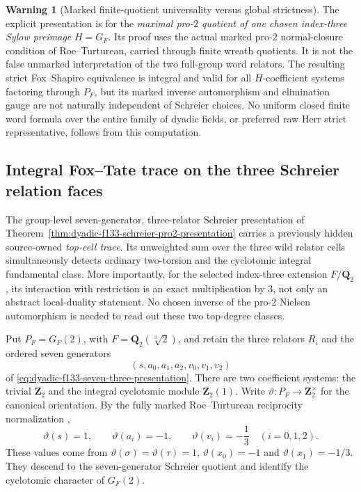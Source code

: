 \documentclass[11pt]{article}
\theoremstyle{definition}
\newtheorem{warning}[theorem]{Warning}
\begin{document}
\begin{warning}[Marked finite-quotient universality versus global strictness]
\label{warn:dyadic-f133-pro2-marked-scope}
The explicit
presentation is
for the
\emph{maximal
pro-$2$ quotient
of one chosen
index-three
Sylow preimage}
$H=G_F$.
Its proof uses
the actual
marked pro-$2$
normal-closure
condition of
Roe--Turturean,
carried through
finite wreath
quotients.
It is not
the false
unmarked
interpretation
of the two
full-group
word relators.
The resulting
strict
Fox--Shapiro
equivalence is
integral and
valid for
all $H$-coefficient
systems
factoring
through $P_F$,
but its marked
inverse automorphism
and elimination
gauge are
not naturally
independent
of Schreier
choices.
No uniform
closed finite
word formula
over the
entire
family of
dyadic fields,
or preferred
raw Herr
strict
representative,
follows from
this computation.
\end{warning}


\subsection{Integral Fox--Tate trace on the three Schreier relation faces}
\label{subsec:dyadic-f134-relative-fox-tate}

The group-level seven-generator, three-relator
Schreier presentation of
Theorem~\ref{thm:dyadic-f133-schreier-pro2-presentation}
carries a previously hidden source-owned
\emph{top-cell trace}.  Its unweighted
sum over the three wild relator cells
simultaneously detects ordinary
two-torsion and the cyclotomic integral
fundamental class.  More importantly,
for the selected index-three extension
$F/\mathbf Q_2$, its interaction with
restriction is an exact multiplication
by $3$, not only an abstract
local-duality statement.
No chosen inverse of the
pro-$2$ Nielsen automorphism
is needed to read out these two
top-degree classes.

Put $P_F=G_F(2)$, with
$F=\mathbf Q_2(\sqrt[3]2)$, and retain
the three relators $R_i$ and
the ordered seven generators
\[
(s,a_0,a_1,a_2,v_0,v_1,v_2)
\]
of
\eqref{eq:dyadic-f133-seven-three-presentation}.
There are two coefficient systems:
the trivial $\mathbf Z_2$
and the integral cyclotomic
module $\mathbf Z_2(1)$.
Write $\vartheta:P_F\to\mathbf Z_2^\times$
for the canonical orientation.
By the fully marked
Roe--Turturean reciprocity
normalization \cite{RoeTurtureanGQ2},
\begin{equation}\label{eq:dyadic-f134-orientation-values}
\boxed{
\vartheta(s)=1,\qquad
\vartheta(a_i)=-1,\qquad
\vartheta(v_i)=-\frac13
\quad(i=0,1,2).
}
\end{equation}
These values come from
$\vartheta(\sigma)=\vartheta(\tau)=1$,
$\vartheta(x_0)=-1$ and
$\vartheta(x_1)=-1/3$.
They descend to the seven-generator
Schreier quotient and identify
the cyclotomic character of $G_F(2)$.
\end{document}
